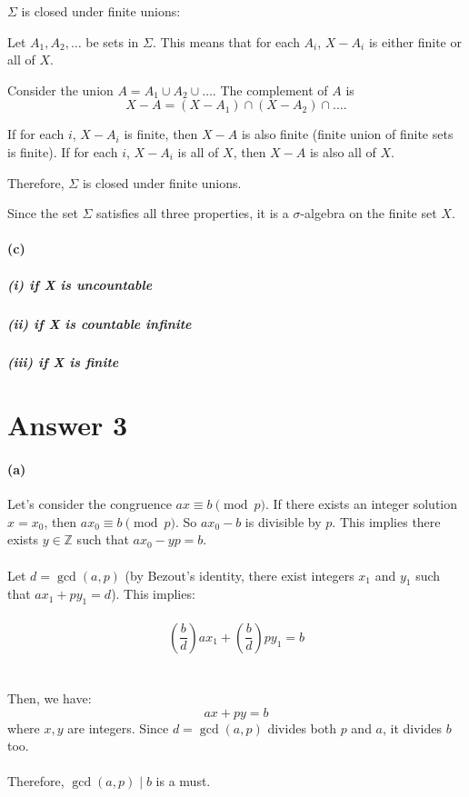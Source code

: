 \documentclass[12pt]{article}
\begin{document}
\par \hspace*{1em}$\Sigma$ is closed under finite unions:

\par \hspace*{1em}Let $A_1, A_2, \ldots$ be sets in $\Sigma$. This means that for each $A_i$, $X - A_i$ is either finite or all of $X$.

\par \hspace*{1em}Consider the union $A = A_1 \cup A_2 \cup \ldots$. The complement of $A$ is
\[
X - A = (X - A_1) \cap (X - A_2) \cap \ldots.
\]

\par \hspace*{1em}If for each $i$, $X - A_i$ is finite, then $X - A$ is also finite (finite union of finite sets is finite). If for each $i$, $X - A_i$ is all of $X$, then $X - A$ is also all of $X$.

\par \hspace*{1em}Therefore, $\Sigma$ is closed under finite unions.

\par \hspace*{1em}Since the set $\Sigma$ satisfies all three properties, it is a $\sigma$-algebra on the finite set $X$.


\paragraph{(c)}
\subparagraph{(i) if X is uncountable}
\subparagraph{(ii) if X is countable infinite}
\subparagraph{(iii) if X is finite}


\section*{Answer 3}

\paragraph{(a)}
Let's consider the congruence \(ax \equiv b \pmod{p}\). If there exists an integer solution \(x=x_0\), then \(ax_0 \equiv b \pmod{p}\). So \(ax_0 - b\) is divisible by \(p\). This implies there exists \(y \in \mathbb{Z}\) such that \(ax_0 - yp = b\).
\\ \\
Let \(d = \gcd(a, p)\) (by Bezout's identity, there exist integers \(x_1\) and \(y_1\) such that \(ax_1 + py_1 = d\)). This implies: 
\\ \\
\[\left(\frac{b}{d}\right)ax_1 + \left(\frac{b}{d}\right)py_1 = b \]
\\ \\
Then, we have:
\[ ax + py = b \]
where \(x, y\) are integers. Since \(d = \gcd(a, p)\) divides both \(p\) and \(a\), it divides \(b\) too. 
\\ \\
Therefore, \(\gcd(a, p) \mid b\) is a must.
\end{document}
